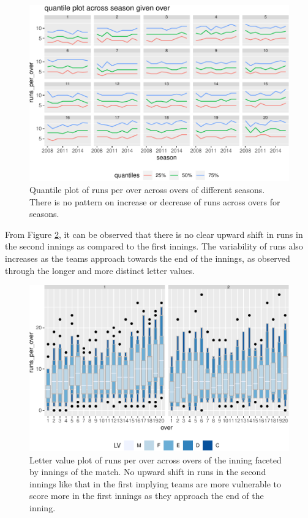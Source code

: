 \documentclass[12pt]{article}
\begin{document}
\begin{figure}

{\centering \includegraphics[width=\textwidth]{figure/seas-over-inning-1} 

}

\caption{Quantile plot of runs per over across overs of different seasons. There is no pattern on increase or decrease of runs across overs for seasons.}\label{fig:seas-over-inning}
\end{figure}

From Figure \ref{fig:cricex}, it can be observed that there is no clear
upward shift in runs in the second innings as compared to the first
innings. The variability of runs also increases as the teams approach
towards the end of the innings, as observed through the longer and more
distinct letter values.

\begin{figure}

{\centering \includegraphics[width=\textwidth]{figure/cricex-1} 

}

\caption{Letter value plot of runs per over across overs of the inning faceted by innings of the match. No upward shift in runs in the second innings like that in the first implying teams are more vulnerable to score more in the first innings as they approach the end of the inning.}\label{fig:cricex}
\end{figure}
\end{document}
